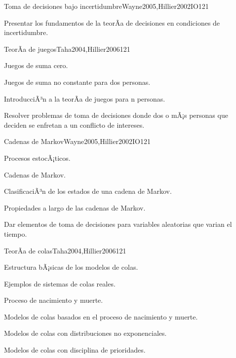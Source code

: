 \begin{syllabus}
\begin{unit}{Toma de decisiones bajo incertidumbre}{Wayne2005,Hillier2002IO}{12}{1}
   \begin{unitgoals}
      \item Presentar los fundamentos de la teorÃ­a de decisiones en condiciones de incertidumbre.
   \end{unitgoals}
\end{unit}

\begin{unit}{TeorÃ­a de juegos}{Taha2004,Hillier2006}{12}{1}
   \begin{topics}
      \item Juegos de suma cero.
      \item Juegos de suma no constante para dos personas.
      \item IntroducciÃ³n a la teorÃ­a de juegos para n personas.
   \end{topics}

   \begin{unitgoals}
      \item Resolver problemas de toma de decisiones donde dos o mÃ¡s personas que deciden se enfretan a un conflicto de intereses.
   \end{unitgoals}
\end{unit}

\begin{unit}{Cadenas de Markov}{Wayne2005,Hillier2002IO}{12}{1}
   \begin{topics}
      \item Procesos estocÃ¡ticos.
      \item Cadenas de Markov.
      \item ClasificaciÃ³n de los estados de una cadena de Markov.
	  \item Propiedades a largo de las cadenas de Markov.
   \end{topics}

   \begin{unitgoals}
      \item Dar elementos de toma de decisiones para variables aleatorias que varian el tiempo.
   \end{unitgoals}
\end{unit}

\begin{unit}{TeorÃ­a de colas}{Taha2004,Hillier2006}{12}{1}
   \begin{topics}
      \item Estructura bÃ¡sicas de los modelos de colas.
      \item Ejemplos de sistemas de colas reales.
      \item Proceso de nacimiento y muerte.
      \item Modelos de colas basados en el proceso de nacimiento y muerte.
      \item Modelos de colas con distribuciones no exponenciales.
      \item Modelos de colas con disciplina de prioridades.
   \end{topics}


\end{unit}
\end{syllabus}
